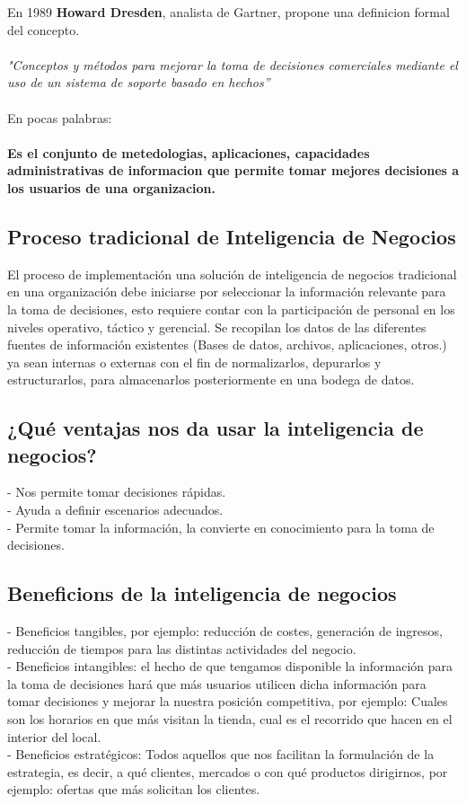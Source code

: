 \documentclass[twoside,twocolumn]{article}
\begin{document}
En 1989 \textbf{Howard Dresden}, analista de Gartner, propone una definicion formal del concepto.
\\ \\
\textsl{"Conceptos y métodos para mejorar la toma de decisiones comerciales mediante el uso de un sistema de soporte basado en hechos''}
\\ \\
En pocas palabras: \\ \\
\textbf{Es el conjunto de metedologias, aplicaciones, capacidades administrativas de informacion que permite tomar mejores decisiones a los usuarios de una organizacion.}


\subsection{Proceso tradicional de Inteligencia de Negocios}

El proceso de implementación una solución de inteligencia de
negocios tradicional en una organización debe iniciarse por
seleccionar la información relevante para la toma de decisiones,
esto requiere contar con la participación de personal en los niveles
operativo, táctico y gerencial. Se recopilan los datos de las
diferentes fuentes de información existentes (Bases de datos,
archivos, aplicaciones, otros.) ya sean internas o externas con el fin
de normalizarlos, depurarlos y estructurarlos, para almacenarlos
posteriormente en una bodega de datos.

\subsection{¿Qué ventajas nos da usar la inteligencia de negocios?}

- Nos permite tomar decisiones rápidas. \\
- Ayuda a definir escenarios adecuados. \\
- Permite tomar la información, la convierte en conocimiento para la toma de decisiones. \\

\subsection{Beneficions de la inteligencia de negocios}

- Beneficios tangibles, por ejemplo: reducción de costes, generación de ingresos, reducción de tiempos para las distintas actividades del negocio. \\
- Beneficios intangibles: el hecho de que tengamos disponible la información para la toma de decisiones hará que más usuarios utilicen dicha información para tomar decisiones y mejorar la nuestra posición competitiva, por ejemplo: Cuales son los horarios en que más visitan la tienda, cual es el recorrido que hacen en el interior del local. \\
- Beneficios estratégicos: Todos aquellos que nos facilitan la formulación de la estrategia, es decir, a qué clientes, mercados o con qué productos dirigirnos, por ejemplo: ofertas que más solicitan los clientes.
\end{document}
